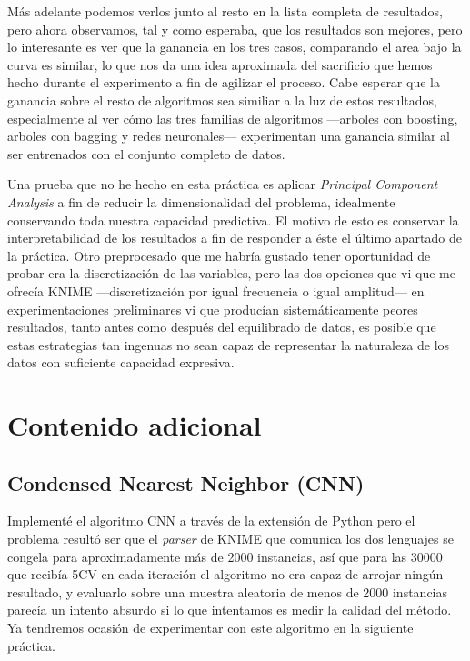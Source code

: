 \documentclass{article}
\newcommand{\img}[2]{
\noindent\makebox[\textwidth][c]{\texttt{[image: \#1]}}%
}
\begin{document}
\img{all}{1.2}

Más adelante podemos verlos junto al resto en la lista completa de resultados, pero ahora observamos, tal y como esperaba, que los resultados son mejores, pero lo interesante es ver que la ganancia en los tres casos, comparando el area bajo la curva es similar, lo que nos da una idea aproximada del sacrificio que hemos hecho durante el experimento a fin de agilizar el proceso. Cabe esperar que la ganancia sobre el resto de algoritmos sea similiar a la luz de estos resultados, especialmente al ver cómo las tres familias de algoritmos ---arboles con boosting, arboles con bagging y redes neuronales--- experimentan una ganancia similar al ser entrenados con el conjunto completo de datos.

Una prueba que no he hecho en esta práctica es aplicar \textit{Principal Component Analysis} a fin de reducir la dimensionalidad del problema, idealmente conservando toda nuestra capacidad predictiva. El motivo de esto es conservar la interpretabilidad de los resultados a fin de responder a éste el último apartado de la práctica. Otro preprocesado que me habría gustado tener oportunidad de probar era la discretización de las variables, pero las dos opciones que vi que me ofrecía KNIME ---discretización por igual frecuencia o igual amplitud--- en experimentaciones preliminares vi que producían sistemáticamente peores resultados, tanto antes como después del equilibrado de datos, es posible que estas estrategias tan ingenuas no sean capaz de representar la naturaleza de los datos con suficiente capacidad expresiva.

\section{Contenido adicional}

\subsection{Condensed Nearest Neighbor (CNN)}

Implementé el algoritmo CNN a través de la extensión de Python pero el problema resultó ser que el \textit{parser} de KNIME que comunica los dos lenguajes se congela para aproximadamente más de 2000 instancias, así que para las 30000 que recibía 5CV en cada iteración el algoritmo no era capaz de arrojar ningún resultado, y evaluarlo sobre una muestra aleatoria de menos de 2000 instancias parecía un intento absurdo si lo que intentamos es medir la calidad del método. Ya tendremos ocasión de experimentar con este algoritmo en la siguiente práctica.
\end{document}
